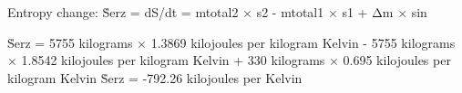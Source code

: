 Entropy change:  
Ṡerz = dS/dt = mtotal2 × s2 - mtotal1 × s1 + Δm × sin  

Ṡerz = 5755 kilograms × 1.3869 kilojoules per kilogram Kelvin - 5755 kilograms × 1.8542 kilojoules per kilogram Kelvin + 330 kilograms × 0.695 kilojoules per kilogram Kelvin  
Ṡerz = -792.26 kilojoules per Kelvin
